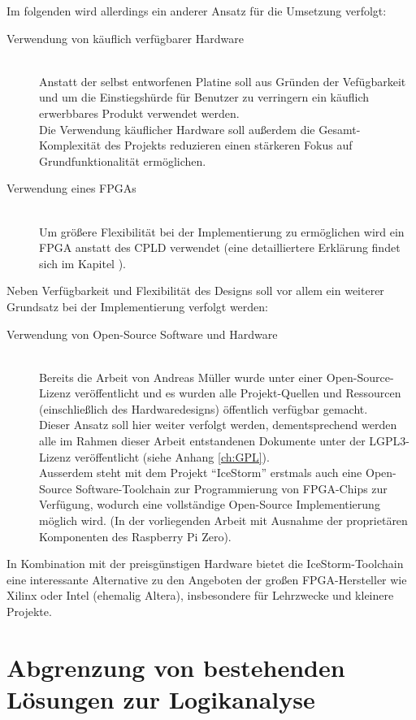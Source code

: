 Im folgenden wird allerdings ein anderer Ansatz für die Umsetzung verfolgt:
\begin{description}
\item[Verwendung von käuflich verfügbarer Hardware] \hfill \\
Anstatt der selbst entworfenen Platine soll aus Gründen der Vefügbarkeit und um die Einstiegshürde für Benutzer zu verringern ein käuflich erwerbbares Produkt verwendet werden.\\
Die Verwendung käuflicher Hardware soll außerdem die Gesamt-Komplexität des Projekts reduzieren einen stärkeren Fokus auf Grundfunktionalität ermöglichen.
\item[Verwendung eines FPGAs] \hfill \\
Um größere Flexibilität bei der Implementierung zu ermöglichen wird ein \gls{FPGA} anstatt des \gls{CPLD} verwendet (eine detailliertere Erklärung findet sich im Kapitel ).
\end{description}

Neben Verfügbarkeit und Flexibilität des Designs soll vor allem ein weiterer Grundsatz bei der Implementierung verfolgt werden:
\begin{description}
\item[Verwendung von Open-Source Software und Hardware] \hfill \\
Bereits die Arbeit von Andreas Müller wurde unter einer Open-Source-Lizenz veröffentlicht und es wurden alle Projekt-Quellen und Ressourcen (einschließlich des Hardwaredesigns) öffentlich verfügbar gemacht.\\
Dieser Ansatz soll hier weiter verfolgt werden, dementsprechend werden alle im Rahmen dieser Arbeit entstandenen Dokumente unter der LGPL3-Lizenz veröffentlicht (siehe Anhang \ref{ch:GPL}).\\
Ausserdem steht mit dem Projekt ``IceStorm'' erstmals auch eine Open-Source Software-Toolchain zur Programmierung von FPGA-Chips zur Verfügung, wodurch eine vollständige Open-Source Implementierung möglich wird. (In der vorliegenden Arbeit mit Ausnahme der proprietären Komponenten des Raspberry Pi Zero).
\end{description}
In Kombination mit der preisgünstigen Hardware bietet die IceStorm-Toolchain eine interessante Alternative zu den Angeboten der großen FPGA-Hersteller wie Xilinx oder Intel (ehemalig Altera), insbesondere für Lehrzwecke und kleinere Projekte.
 
\section{Abgrenzung von bestehenden Lösungen zur Logikanalyse}

